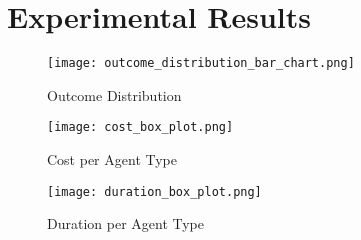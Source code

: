 \begin{comment}
The experimental setup should include all data --- parameters, etc. --- that would allow a person to repeat your experiments.
This will thus be the actual instantiation for each experiment of the general architecture described in Chapter~\ref{cha:architecture}.
\end{comment}
\section{Experimental Results}
\label{sec:experimentalResults}

\begin{comment}
Results should be clearly displayed and should provide a suitable representation of your results for the points you wish to make.
Graphs should be labelled in a legible font. If more than one result is displayed in the same graph, then these should be clearly marked.
Please choose carefully rather than presenting every result. Too much information is hard to read and often hides the key information you wish to present. Make use of statistical methods when presenting results, where possible to strengthen the results.
Further, the format of the presentation of results should be chosen based on what issues in the results you wish to highlight.
You may wish to present a subset in the experimental section and provide additional results in an appendix.
Point out specifics here but save the overall/general discussion to the Discussion chapter.
\end{comment}

\begin{figure}[htbp]
    \centering
    \texttt{[image: outcome\_distribution\_bar\_chart.png]}
    \caption{Outcome Distribution}
    \label{fig:outcome_distribution}
\end{figure}

\begin{figure}[htbp]
    \centering
    \texttt{[image: cost\_box\_plot.png]}
    \caption{Cost per Agent Type}
    \label{fig:cost_box_plot}
\end{figure}

\begin{figure}[htbp]
    \centering
    \texttt{[image: duration\_box\_plot.png]}
    \caption{Duration per Agent Type}
    \label{fig:duration_box_plot}
\end{figure}

